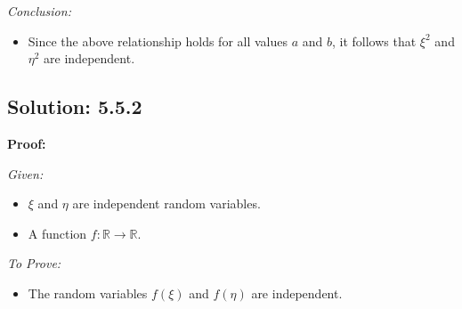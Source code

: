 \textit{Conclusion:}
\begin{itemize}
    \item Since the above relationship holds for all values \( a \) and \( b \), it follows that \(\xi^2\) and \(\eta^2\) are independent.
\end{itemize}

\subsection*{Solution: 5.5.2}

\textbf{Proof:}

\textit{Given:}
\begin{itemize}
    \item \(\xi\) and \(\eta\) are independent random variables.
    \item A function \(f : \mathbb{R} \rightarrow \mathbb{R}\).
\end{itemize}

\textit{To Prove:}
\begin{itemize}
    \item The random variables \(f(\xi)\) and \(f(\eta)\) are independent.
\end{itemize}

